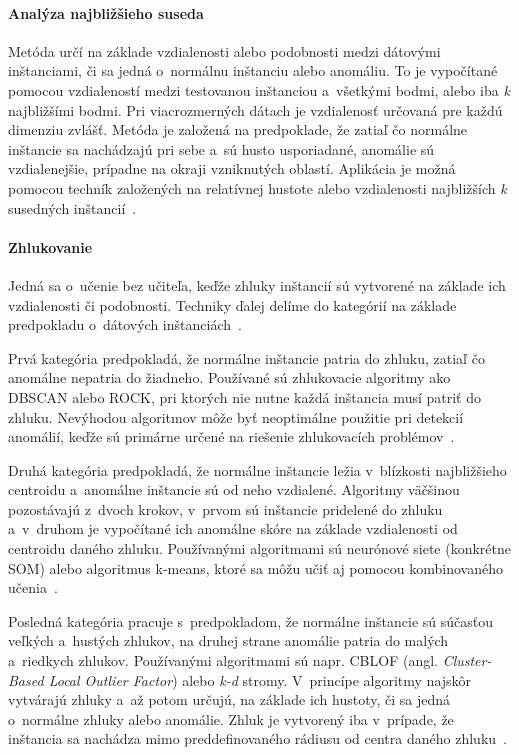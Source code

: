 \documentclass[a4paper,twoside,slovak,12pt,appendix]{article}
\begin{document}
\paragraph{Analýza najbližšieho suseda}
Metóda určí na základe vzdialenosti alebo podobnosti medzi dátovými inštanciami,
či sa jedná o~normálnu inštanciu alebo anomáliu. To je vypočítané pomocou
vzdialeností medzi testovanou inštanciou a~všetkými bodmi, alebo iba \textit{k}
najbližšími bodmi. Pri viacrozmerných dátach je vzdialenosť určovaná pre
každú dimenziu zvlášť. Metóda je založená na predpoklade, že zatiaľ čo normálne
inštancie sa nachádzajú pri sebe a~sú husto usporiadané, anomálie sú
vzdialenejšie, prípadne na okraji vzniknutých oblastí. Aplikácia je možná
pomocou techník založených na relatívnej hustote alebo vzdialenosti najbližších
\textit{k} susedných inštancií~\cite{Chandola2009,Tan2005}.

\paragraph{Zhlukovanie}
Jedná sa o~učenie bez učiteľa, keďže zhluky inštancií sú vytvorené na základe
ich vzdialenosti či podobnosti. Techniky ďalej delíme do kategórií na základe
predpokladu o~dátových inštanciách~\cite{Chandola2009,Tan2005}.

Prvá kategória predpokladá, že normálne inštancie patria do zhluku, zatiaľ čo
anomálne nepatria do žiadneho. Používané sú zhlukovacie algoritmy ako DBSCAN
alebo ROCK, pri ktorých nie nutne každá inštancia musí patriť do zhluku.
Nevýhodou algoritmov môže byť neoptimálne použitie pri detekcií
anomálií, keďže sú primárne určené na riešenie zhlukovacích
problémov~\cite{Chandola2009}.

Druhá kategória predpokladá, že normálne inštancie ležia v~blízkosti
najbližšieho centroidu a~anomálne inštancie sú od neho vzdialené. Algoritmy
väčšinou pozostávajú z~dvoch krokov, v~prvom sú inštancie pridelené do zhluku
a~v~druhom je vypočítané ich anomálne skóre na základe vzdialenosti od centroidu
daného zhluku. Používanými algoritmami sú neurónové siete (konkrétne SOM) alebo
algoritmus k-means, ktoré sa môžu učiť aj pomocou kombinovaného
učenia~\cite{Chandola2009}.

Posledná kategória pracuje s~predpokladom, že normálne inštancie sú súčasťou
veľkých a~hustých zhlukov, na druhej strane anomálie patria do malých a~riedkych
zhlukov. Používanými algoritmami sú napr. CBLOF
(angl. \textit{Cluster-Based Local Outlier Factor}) alebo \textit{k-d} stromy.
V~princípe algoritmy najskôr vytvárajú zhluky a~až potom určujú, na základe ich
hustoty, či sa jedná o~normálne zhluky alebo anomálie. Zhluk je vytvorený iba
v~prípade, že inštancia sa nachádza mimo preddefinovaného rádiusu od centra
daného zhluku~\cite{Salvador2005}.
\end{document}
